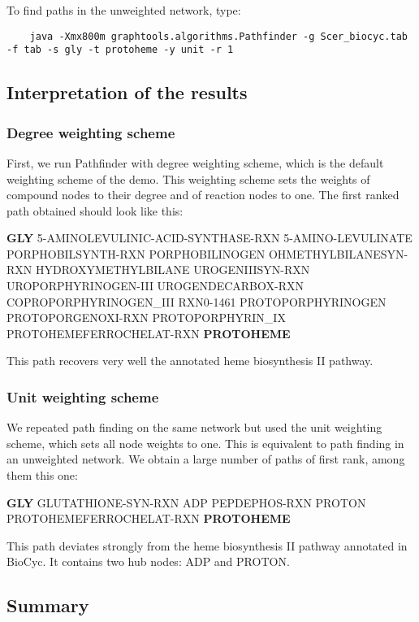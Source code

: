 To find paths in the unweighted network, type:
	{\color{Blue} \begin{footnotesize}
		\begin{verbatim}
	java -Xmx800m graphtools.algorithms.Pathfinder -g Scer_biocyc.tab -f tab -s gly -t protoheme -y unit -r 1
	\end{verbatim} \end{footnotesize}
	}

\subsection{Interpretation of the results}

\subsubsection{Degree weighting scheme}

First, we run Pathfinder with degree weighting scheme, which is the default weighting scheme of the demo. This weighting scheme sets the weights of compound nodes to their degree and of reaction nodes to one. The first ranked path obtained should look like this:

\textbf{GLY} 5-AMINOLEVULINIC-ACID-SYNTHASE-RXN  5-AMINO-LEVULINATE  PORPHOBILSYNTH-RXN PORPHOBILINOGEN OHMETHYLBILANESYN-RXN HYDROXYMETHYLBILANE UROGENIIISYN-RXN UROPORPHYRINOGEN-III UROGENDECARBOX-RXN COPROPORPHYRINOGEN\_III RXN0-1461 PROTOPORPHYRINOGEN PROTOPORGENOXI-RXN PROTOPORPHYRIN\_IX PROTOHEMEFERROCHELAT-RXN \textbf{PROTOHEME}

This path recovers very well the annotated heme biosynthesis II pathway.

\subsubsection{Unit weighting scheme}
We repeated path finding on the same network but used the unit weighting scheme, which sets all node weights to one. This is equivalent to path finding in an unweighted network. We obtain a large number of paths of first rank, among them this one:

\textbf{GLY} GLUTATHIONE-SYN-RXN ADP PEPDEPHOS-RXN PROTON PROTOHEMEFERROCHELAT-RXN \textbf{PROTOHEME}

This path deviates strongly from the heme biosynthesis II pathway annotated in BioCyc. It contains two hub nodes: ADP and PROTON.

\subsection{Summary}

